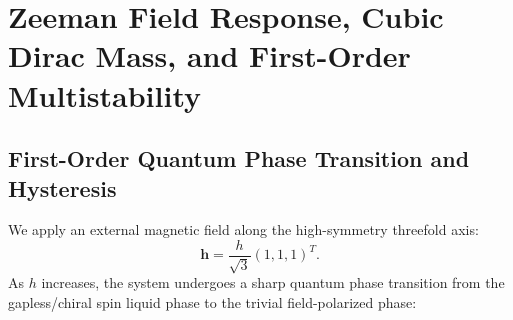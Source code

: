 \section{Zeeman Field Response, Cubic Dirac Mass, and First-Order Multistability}
\label{sec:field_response}

\subsection{First-Order Quantum Phase Transition and Hysteresis}
We apply an external magnetic field along the high-symmetry threefold axis:
\begin{equation}
\label{eq:field_111}
\mathbf{h} = \frac{h}{\sqrt{3}}(1, 1, 1)^T.
\end{equation}
As $h$ increases, the system undergoes a sharp quantum phase transition from the gapless/chiral spin liquid phase to the trivial field-polarized phase:

